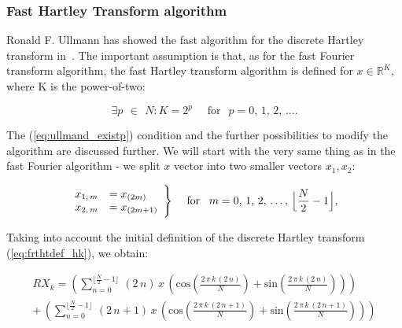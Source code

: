 \documentclass[12pt,twoside,a4paper]{article}
\numberwithin{equation}{subsection}
\numberwithin{figure}{subsection}
\begin{document}
\subsubsection*{Fast Hartley Transform algorithm}

Ronald F. Ullmann has showed the fast algorithm for the discrete Hartley transform in~\cite{ullmann_algorithm}. The important assumption is that, as for the fast Fourier transform algorithm, the fast Hartley transform algorithm is defined for $x \in \mathbb{R} ^ K$, where K is the power-of-two:

\begin{equation} \label{eq:ullmand_existp}
  \exists p \, \ \in \ \, N : K = 2 ^ {p} \quad \mbox{ for } \ \, p = 0, \, 1, \, 2, \, \ldots  .
\end{equation}

The (\ref{eq:ullmand_existp}) condition and the further possibilities to modify the algorithm are discussed further. We will start with the very same thing as in the fast Fourier algorithm - we split $x$ vector into two smaller vectors $x_1, x_2$:

\begin{subequations} \label{eq:hartley_smallervectors}
	\begin{equation}   \label{eq:hsvs_oddeven}
		\begin{array}{c l}      
			x_{1, \, m} &= x_{(2m)} \\
			x_{2, \, m} &= x_{(2m+1)} 
		\end{array}\Bigg\} 
		\quad \mbox{ for } \ \, m = 0, \, 1, \, 2, \, \ldots, \, \Big\lfloor \frac{N}{2} - 1 \Big\rfloor , \\
  \end{equation}
\end{subequations}

Taking into account the initial definition of the discrete Hartley transform (\ref{eq:frthtdef_hk}), we obtain:

\begin{multline}  \label{eq:hartley_longdht}
	RX_k = 
		\left( 
 			\sum_{n = 0}^{\lfloor \frac{N}{2} - 1 \rfloor } \, (2 \, n ) \, x \,  \left(
 				\mathrm{cos} \left( \frac {2 \, \pi \, k \, (2 \, n) }{N} \right) 
  	  	  	  + \mathrm{sin} \left( \frac {2 \, \pi \, k \, (2 \, n) }{N} \right) \right) 
        \right)  
\\ + \, \left( 
 			\sum_{n = 0}^{\lfloor \frac{N}{2} - 1 \rfloor } \, (2 \, n + 1) \, x \,  \left(
 				\mathrm{cos} \left( \frac {2 \, \pi \, k \, (2 \, n + 1)}{N} \right) 
 	  	      + \mathrm{sin} \left( \frac {2 \, \pi \, k \, (2 \, n + 1)}{N} \right) \right) 
 	  	\right)
\end{multline}
\end{document}
